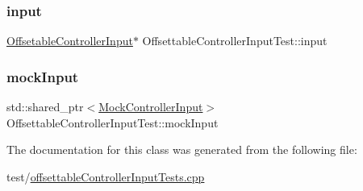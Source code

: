 \subsubsection{\texorpdfstring{input}{input}}
{\footnotesize\ttfamily \mbox{\hyperlink{classokapi_1_1OffsetableControllerInput}{Offsetable\+Controller\+Input}}$\ast$ Offsettable\+Controller\+Input\+Test\+::input\hspace{0.3cm}{\ttfamily [protected]}}

\mbox{\label{classOffsettableControllerInputTest_a1e0171ecf521e79cc7d5bf78b5752991}} 
\subsubsection{\texorpdfstring{mockInput}{mockInput}}
{\footnotesize\ttfamily std\+::shared\+\_\+ptr$<$\mbox{\hyperlink{classokapi_1_1MockControllerInput}{Mock\+Controller\+Input}}$>$ Offsettable\+Controller\+Input\+Test\+::mock\+Input\hspace{0.3cm}{\ttfamily [protected]}}



The documentation for this class was generated from the following file\+:\begin{DoxyCompactItemize}
\item 
test/\mbox{\hyperlink{offsettableControllerInputTests_8cpp}{offsettable\+Controller\+Input\+Tests.\+cpp}}\end{DoxyCompactItemize}
